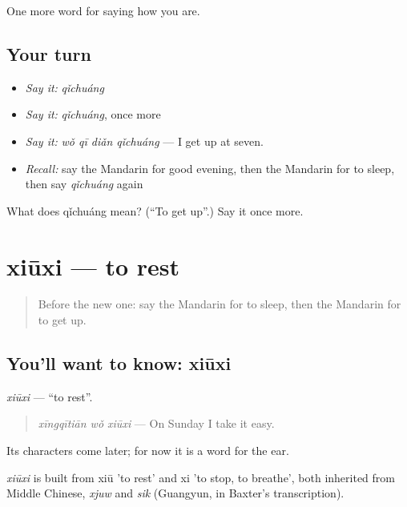\begin{grammarlens}[title={What you've built}]
One more word for saying how you are.
\end{grammarlens}

\subsection*{Your turn}
\begin{itemize}
\raggedright
  \item \emph{Say it:} \emph{qǐchuáng}
  \item \emph{Say it:} \emph{qǐchuáng}, once more
  \item \emph{Say it:} \emph{wǒ qī diǎn qǐchuáng} — I get up at seven.
  \item \emph{Recall:} say the Mandarin for good evening, then the Mandarin for to sleep, then say \emph{qǐchuáng} again
\end{itemize}

\begin{tcolorbox}[breakable,colback=teal!4,colframe=teal!35!black,title={Before you move on}]
What does qǐchuáng mean? (\textquotedblleft{}To get up\textquotedblright{}.) Say it once more.
\end{tcolorbox}
\section[xiūxi]{xiūxi — to rest}

\label{lesson:ZH-C50-xiuxi}



\begin{quote}
Before the new one: say the Mandarin for to sleep, then the Mandarin for to get up.
\end{quote}

\subsection*{You'll want to know: xiūxi}
\emph{xiūxi} — \textquotedblleft{}to rest\textquotedblright{}.

\begin{quote}
\emph{xīngqītiān wǒ xiūxi} — On Sunday I take it easy.
\end{quote}

Its characters come later; for now it is a word for the ear.

\begin{cousinweb}
\emph{xiūxi} is built from xiū 'to rest' and xi 'to stop, to breathe', both inherited from Middle Chinese, \emph{xjuw} and \emph{sik} (Guangyun, in Baxter's transcription).
\end{cousinweb}

